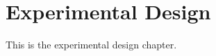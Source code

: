 \documentclass[../main.tex]{subfiles}
\begin{document}
\chapter{Experimental Design}

This is the experimental design chapter.
\end{document}
